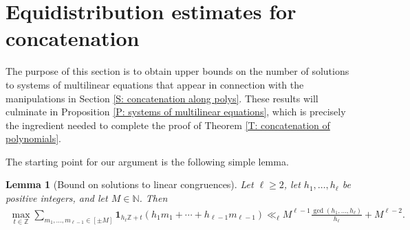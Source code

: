 \documentclass[11pt]{amsart}
\newtheorem{lemma}{Lemma}[section]
\theoremstyle{definition}
\newcommand{\N}{{\mathbb N}}
\newcommand{\Z}{{\mathbb Z}}
\begin{document}
\section{Equidistribution estimates for concatenation}\label{S: equidistribution}

The purpose of this section is to obtain upper bounds on the number of solutions to systems of multilinear equations that appear in connection with the manipulations in Section \ref{S: concatenation along polys}.
These results will culminate in Proposition \ref{P: systems of multilinear equations}, which is precisely the ingredient needed to complete the proof of Theorem \ref{T: concatenation of polynomials}.

The starting point for our argument is the following simple lemma. 
\begin{lemma}[Bound on solutions to linear congruences]\label{L: linear congruences}
    Let $\ell\geq 2$, let $h_1, \ldots, h_\ell$ be positive integers, and let $M\in\N$. Then
    \begin{align*}
        \max_{t\in\Z}\sum_{m_1, \ldots, m_{\ell-1}\in[\pm M]}\mathbf{1}_{h_\ell \mathbb{Z} + t}(h_1 m_1 + \cdots + h_{\ell-1} m_{\ell-1}) \ll_\ell M^{\ell-1}\frac{\gcd(h_1, \ldots, h_\ell)}{h_\ell} + M^{\ell-2}.
    \end{align*}
\end{lemma}
\end{document}
